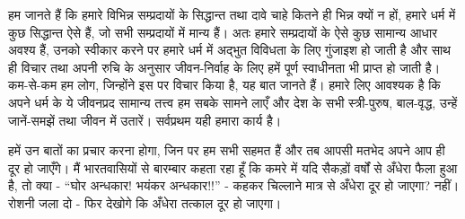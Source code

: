 
हम जानते हैं कि हमारे विभिन्न सम्प्रदायों के सिद्धान्त तथा दावे चाहे कितने ही भिन्न क्यों न हों, हमारे धर्म में कुछ सिद्धान्त ऐसे हैं, जो सभी सम्प्रदायों में मान्य हैं। अतः हमारे सम्प्रदायों के ऐसे कुछ सामान्य आधार अवश्य हैं, उनको स्वीकार करने पर हमारे धर्म में अद्भुत विविधता के लिए गुंजाइश हो जाती है और साथ ही विचार तथा अपनी रुचि के अनुसार जीवन-निर्वाह के लिए हमें पूर्ण स्वाधीनता भी प्राप्त हो जाती है। कम-से-कम हम लोग, जिन्होंने इस पर विचार किया है, यह बात जानते हैं। हमारे लिए आवश्यक है कि अपने धर्म के ये जीवनप्रद सामान्य तत्त्व हम सबके सामने लाएँ और देश के सभी स्त्री-पुरुष, बाल-वृद्ध, उन्हें जानें-समझें तथा जीवन में उतारें। सर्वप्रथम यही हमारा कार्य है। 

हमें उन बातों का प्रचार करना होगा, जिन पर हम सभी सहमत हैं और तब आपसी मतभेद अपने आप ही दूर हो जाएँगे। मैं भारतवासियों से बारम्बार कहता रहा हूँ कि कमरे में यदि सैकड़ों वर्षों से अँधेरा फैला हुआ है, तो क्या - “घोर अन्धकार! भयंकर अन्धकार!!” - कहकर चिल्लाने मात्र से अँधेरा दूर हो जाएगा? नहीं। रोशनी जला दो - फिर देखोगे कि अँधेरा तत्काल दूर हो जाएगा। 

\delimiter

\addtoendnotes{\protect\end{multicols}}


